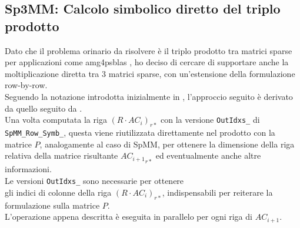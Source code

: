 \subsection{Sp3MM: Calcolo simbolico diretto del triplo prodotto} \label{chSpMMSymb:Sp3MMSymb}
Dato che il problema orinario da risolvere è il triplo prodotto tra matrici sparse per applicazioni come 
amg4psblas , ho deciso di cercare di supportare anche la moltiplicazione diretta 
tra 3 matrici sparse, con un'estensione della formulazione row-by-row.\\
Seguendo la notazione introdotta inizialmente in , l'approccio seguito è derivato da quello seguito da .\\
Una volta computata la riga $\left(R\cdot AC_i\right)_{r*}$ con la versione \verb|OutIdxs_| di \verb|SpMM_Row_Symb_|, 
questa viene riutilizzata direttamente nel prodotto con la matrice $P$, analogamente al caso di SpMM,
per ottenere la dimensione della riga relativa della matrice risultante ${AC_{i+1}}_{r*}$ ed eventualmente anche altre informazioni.\\ 
Le versioni \verb|OutIdxs_| sono necessarie per ottenere \\gli indici di colonne della riga $\left(R\cdot AC_i\right)_{r*}$,
indispensabili per reiterare la formulazione \rowbyrow sulla matrice $P$.\\
L'operazione appena descritta è eseguita in parallelo per ogni riga di $AC_{i+1}$.\\

